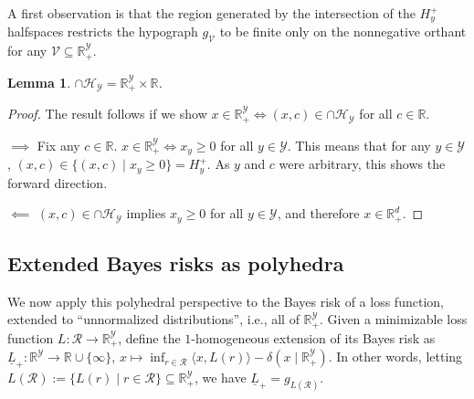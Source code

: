 \documentclass[11pt]{article}
\newcommand{\reals}{\mathbb{R}}
\renewcommand{\H}{\mathcal{H}}
\newcommand{\R}{\mathcal{R}}
\newcommand{\V}{\mathcal{V}}
\newcommand{\Y}{\mathcal{Y}}
\newcommand{\risk}[1]{\underline{#1}}
\newcommand{\inprod}[2]{\langle #1, #2 \rangle}%
\newtheorem{lemma}{Lemma}
\begin{document}
A first observation is that the region generated by the intersection of the $H^+_y$ halfspaces restricts the hypograph $g_\V$ to be finite only on the nonnegative orthant for any $\V \subseteq \reals^\Y_+$.
\begin{lemma}\label{lem:x-nonneg-orthant-iff-intersection-HY}
  $\cap \H_\Y = \reals^\Y_+ \times \reals$.
\end{lemma}
\begin{proof}
  The result follows if we show $x \in \reals^\Y_+ \iff (x,c) \in \cap \H_\Y$ for all $c \in \reals$.

  $\implies$
  Fix any $c \in \reals$.
  $x \in \reals^\Y_+ \iff x_y \geq 0$ for all $y \in \Y$.
  This means that for any $y \in \Y$, $(x,c) \in \{(x,c) \mid x_y \geq 0\} = H^+_y$.
  As $y$ and $c$ were arbitrary, this shows the forward direction.
  
  $\impliedby$
  $(x,c) \in \cap \H_\Y$ implies $x_y \geq 0$ for all $y \in \Y$, and therefore $x \in \reals^d_+$.	
\end{proof}


\subsection{Extended Bayes risks as polyhedra}\label{appsubsec:phase2}

We now apply this polyhedral perspective to the Bayes risk of a loss function, extended to ``unnormalized distributions'', i.e., all of $\reals^\Y_+$.
Given a minimizable loss function $L : \R \to \reals^\Y_+$, define the $1$-homogeneous extension of its Bayes risk as
$\risk{L}_+:\reals^\Y\to\reals\cup\{\infty\}$, $x \mapsto \inf_{r\in\R} \inprod{x}{L(r)} - \delta(x \mid \reals^\Y_+)$.
In other words, letting $L(\R) := \{L(r) \mid r\in\R\} \subseteq \reals^\Y_+$, we have $\risk L_+ = g_{L(\R)}$.
\end{document}
